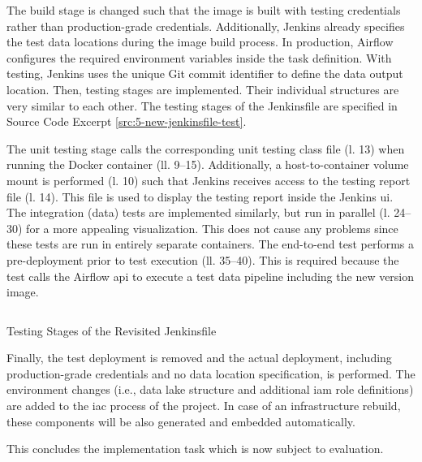 The build stage is changed such that the image is built with testing credentials rather than production-grade credentials. Additionally, Jenkins already specifies the test data locations during the image build process. In production, Airflow configures the required environment variables inside the task definition. With testing, Jenkins uses the unique Git commit identifier to define the data output location. Then, testing stages are implemented. Their individual structures are very similar to each other. The testing stages of the Jenkinsfile are specified in Source Code Excerpt \ref{src:5-new-jenkinsfile-test}.

The unit testing stage calls the corresponding unit testing class file (l. 13) when running the Docker container (ll. 9--15). Additionally, a host-to-container volume mount is performed (l. 10) such that Jenkins receives access to the testing report file (l. 14). This file is used to display the testing report inside the Jenkins \ac{ui}. The integration (data) tests are implemented similarly, but run in parallel (l. 24--30) for a more appealing visualization. This does not cause any problems since these tests are run in entirely separate containers. The end-to-end test performs a pre-deployment prior to test execution (ll. 35--40). This is required because the test calls the Airflow \acs{api} to execute a test data pipeline including the new version image.

\begin{listing}[h!]
	\inputminted{groovy}{main-matter/src/5-new-jenkinsfile-test}
	\caption{Testing Stages of the Revisited Jenkinsfile}
	\label{src:5-new-jenkinsfile-test}
\end{listing}

Finally, the test deployment is removed and the actual deployment, including production-grade credentials and no data location specification, is performed. The environment changes (i.e., data lake structure and additional \ac{iam} role definitions) are added to the \ac{iac} process of the project. In case of an infrastructure rebuild, these components will be also generated and embedded automatically.

This concludes the implementation task which is now subject to evaluation.



